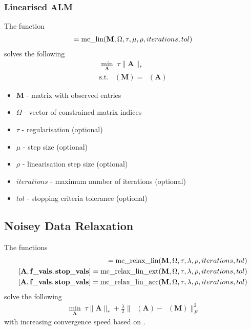 \documentclass{article}
\DeclareMathOperator*{\pro}{\mathcal P_{\Omega}}
\begin{document}
\subsubsection{Linearised ALM}
\label{mc_lin}

The function
\begin{align}
[ \mathbf A, \mathbf{f\_vals}, \mathbf{stop\_vals} ] = \text{mc\_lin}( \mathbf M, \Omega, \tau, \mu, \rho, iterations, tol ) \notag 
\end{align}
solves the following
\begin{align}
\min_{\mathbf A} \; \tau \| \mathbf A \|_* \\
\text{s.t.} \; \pro (\mathbf M) = \pro (\mathbf A) \nonumber 
\end{align}

\begin{itemize}
\item $\mathbf M$ - matrix with observed entries
\item $\Omega$ - vector of constrained matrix indices
\item $\tau$ - regularisation (optional)
\item $\mu$ - step size (optional)
\item $\rho$ - linearisation step size (optional)
\item $iterations$ - maximum number of iterations (optional)
\item $tol$ - stopping criteria tolerance (optional)
\end{itemize}

\subsection{Noisey Data Relaxation}
\label{mc_relax}

The functions
\begin{align}
[ \mathbf A, \mathbf{f\_vals}, \mathbf{stop\_vals} ] = \text{mc\_relax\_lin}( \mathbf M, \Omega, \tau, \lambda, \rho, iterations, tol ) \notag \\
[ \mathbf A, \mathbf{f\_vals}, \mathbf{stop\_vals} ] = \text{mc\_relax\_lin\_ext}( \mathbf M, \Omega, \tau, \lambda, \rho, iterations, tol ) \notag \\
[ \mathbf A, \mathbf{f\_vals}, \mathbf{stop\_vals} ] = \text{mc\_relax\_lin\_acc}( \mathbf M, \Omega, \tau, \lambda, \rho, iterations, tol )\notag 
\end{align}
solve the following
\begin{align}
\min_{\mathbf A} \; \tau \| \mathbf A \|_*  +  \frac{\lambda}{2} \| \mathbf{ \pro (A) - \pro (M)  } \|^2_F 
\end{align}
with increasing convergence speed based on \cite{ji2009accelerated}.
\end{document}
